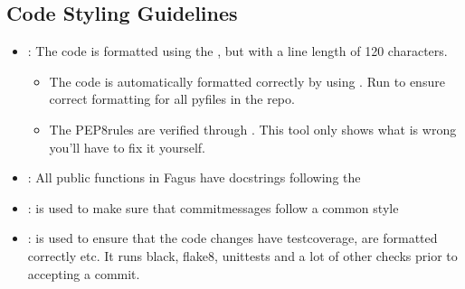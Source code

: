 \documentclass[a4paper,10pt,english]{sphinxmanual}
\begin{document}
\subsection{Code Styling Guidelines}
\label{\detokenize{CONTRIBUTING:code-styling-guidelines}}\begin{itemize}
\item {}
\sphinxAtStartPar
{}: The code is formatted using the , but with a line length of 120 characters.
\begin{itemize}
\item {}
\sphinxAtStartPar
The code is automatically formatted correctly by using . Run  to ensure correct formatting for all py\sphinxhyphen{}files in the repo.

\item {}
\sphinxAtStartPar
The PEP\sphinxhyphen{}8\sphinxhyphen{}rules are verified through . This tool only shows what is wrong \sphinxhyphen{} you’ll have to fix it yourself.

\end{itemize}

\item {}
\sphinxAtStartPar
{}: All public functions in Fagus have docstrings following the 

\item {}
\sphinxAtStartPar
{}:  is used to make sure that commit\sphinxhyphen{}messages follow a common style

\item {}
\sphinxAtStartPar
{}:  is used to ensure that the code changes have test\sphinxhyphen{}coverage, are formatted correctly etc. It runs black, flake8, unittests and a lot of other checks prior to accepting a commit.

\end{itemize}
\end{document}
